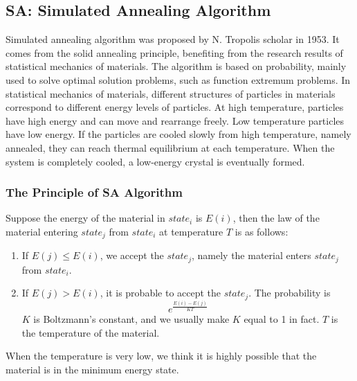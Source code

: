 \documentclass{llncs}
\begin{document}
	\subsection{SA: Simulated Annealing Algorithm} \label{subsec-sa}
	Simulated annealing algorithm was proposed by N. Tropolis scholar in 1953. It comes from the solid annealing principle, benefiting from the research results of statistical mechanics of materials. The algorithm is based on probability,  mainly used to solve optimal solution problems, such as function extremum problems. In statistical mechanics of materials, different structures of particles in materials correspond to different energy levels of particles. At high temperature, particles have high energy and can move and rearrange freely. Low temperature particles have low energy. If the particles are cooled slowly from high temperature, namely annealed, they can reach thermal equilibrium at each temperature. When the system is completely cooled, a low-energy crystal is eventually formed.
	
	\subsubsection{The Principle of SA Algorithm} \label{subsubsec-principle}
	Suppose the energy of the material in $state_i$ is $E(i)$, then the law of the material entering $state_j$ from $state_i$ at temperature $T$ is as follows:
	\begin{enumerate}
		\item If $E(j) \leq E(i)$, we accept the $state_j$, namely the material enters $state_j$ from $state_i$.
		\item If $E(j) > E(i)$, it is probable to accept the $state_j$. The probability is
		\[
		e^\frac{E(i)-E(j)}{KT}
		\]
		$K$ is Boltzmann's constant, and we usually make $K$ equal to 1 in fact. $T$ is the temperature of the material.
	\end{enumerate}
	When the temperature is very low, we think it is highly possible that the material is in the minimum energy state. 
	
\end{document}
